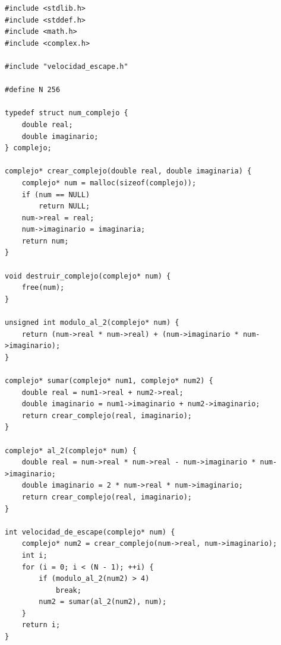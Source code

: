 \documentclass[a4paper,10pt]{article}
\begin{document}
\begin{verbatim}
#include <stdlib.h>
#include <stddef.h>
#include <math.h>
#include <complex.h>

#include "velocidad_escape.h"

#define N 256

typedef struct num_complejo {
	double real;
	double imaginario;
} complejo;

complejo* crear_complejo(double real, double imaginaria) {
	complejo* num = malloc(sizeof(complejo));
	if (num == NULL)
		return NULL;
	num->real = real;
	num->imaginario = imaginaria;
	return num;
}

void destruir_complejo(complejo* num) {
	free(num);
}

unsigned int modulo_al_2(complejo* num) {
	return (num->real * num->real) + (num->imaginario * num->imaginario);
}

complejo* sumar(complejo* num1, complejo* num2) {
	double real = num1->real + num2->real;
	double imaginario = num1->imaginario + num2->imaginario;
	return crear_complejo(real, imaginario);
}

complejo* al_2(complejo* num) {
	double real = num->real * num->real - num->imaginario * num->imaginario;
	double imaginario = 2 * num->real * num->imaginario;
	return crear_complejo(real, imaginario);
}

int velocidad_de_escape(complejo* num) {
	complejo* num2 = crear_complejo(num->real, num->imaginario);
	int i;
	for (i = 0; i < (N - 1); ++i) {
		if (modulo_al_2(num2) > 4)
			break;
		num2 = sumar(al_2(num2), num);
	}
	return i;
}

\end{verbatim}
\end{document}
